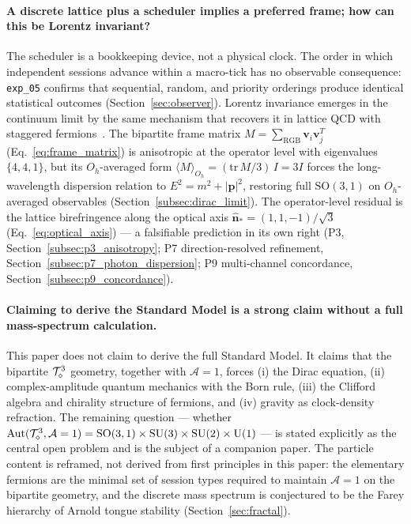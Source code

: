 \paragraph{A discrete lattice plus a scheduler implies a preferred
frame; how can this be Lorentz invariant?}
The scheduler is a bookkeeping device, not a physical clock.
The order in which independent sessions advance within a macro-tick
has no observable consequence: \texttt{exp\_05} confirms that
sequential, random, and priority orderings produce identical
statistical outcomes (Section~\ref{sec:observer}).
Lorentz invariance emerges in the continuum limit by the same
mechanism that recovers it in lattice QCD with staggered
fermions~\cite{kogutsusskind1975, susskind1977}.  The bipartite
frame matrix $M = \sum_\text{RGB}\mathbf{v}_i\mathbf{v}_j^T$
(Eq.~\ref{eq:frame_matrix}) is anisotropic at the operator level
with eigenvalues $\{4, 4, 1\}$, but its $O_h$-averaged form
$\langle M\rangle_{O_h} = (\mathrm{tr}\,M / 3)\,I = 3I$ forces the
long-wavelength dispersion relation to $E^2 = m^2 + |\mathbf{p}|^2$,
restoring full $\mathrm{SO}(3,1)$ on $O_h$-averaged observables
(Section~\ref{subsec:dirac_limit}).
The operator-level residual is the lattice birefringence along the
optical axis $\hat{\mathbf{n}}_* = (1,1,-1)/\sqrt{3}$
(Eq.~\ref{eq:optical_axis}) --- a falsifiable prediction in its own
right (P3, Section~\ref{subsec:p3_anisotropy}; P7 direction-resolved
refinement, Section~\ref{subsec:p7_photon_dispersion};
P9 multi-channel concordance,
Section~\ref{subsec:p9_concordance}).

\paragraph{Claiming to derive the Standard Model is a strong claim
without a full mass-spectrum calculation.}
This paper does not claim to derive the full Standard Model.
It claims that the bipartite $\mathcal{T}_\diamond^3$ geometry, together with
$\mathcal{A}=1$, forces (i) the Dirac equation, (ii) complex-amplitude
quantum mechanics with the Born rule, (iii) the Clifford algebra and
chirality structure of fermions, and (iv) gravity as clock-density
refraction.
The remaining question --- whether
$\mathrm{Aut}(\mathcal{T}_\diamond^3,\mathcal{A}=1) =
\mathrm{SO}(3,1)\times\mathrm{SU}(3)\times\mathrm{SU}(2)\times
\mathrm{U}(1)$ --- is stated explicitly as the central open problem
and is the subject of a companion paper.
The particle content is reframed, not derived from first principles
in this paper: the elementary fermions are the minimal set of session
types required to maintain $\mathcal{A}=1$ on the bipartite geometry,
and the discrete mass spectrum is conjectured to be the Farey hierarchy
of Arnold tongue stability (Section~\ref{sec:fractal}).

